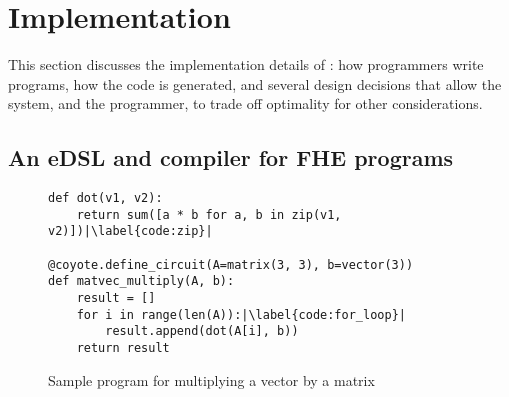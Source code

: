 \section{Implementation}\label{sec:implementation}

This section discusses the implementation details of \system: how programmers write \system programs, how the code is generated, and several design decisions that allow the system, and the programmer, to trade off optimality for other considerations.

  

\subsection{An eDSL and compiler for FHE programs}\label{sec:surface-language}
\begin{figure}
    \begin{verbatim}
def dot(v1, v2):
    return sum([a * b for a, b in zip(v1, v2)])|\label{code:zip}|
  
@coyote.define_circuit(A=matrix(3, 3), b=vector(3))
def matvec_multiply(A, b):
    result = []
    for i in range(len(A)):|\label{code:for_loop}|
        result.append(dot(A[i], b))
    return result
    \end{verbatim}
    \caption{Sample \system program for multiplying a vector by a matrix}\label{fig:coyote-program}
\end{figure}

            
